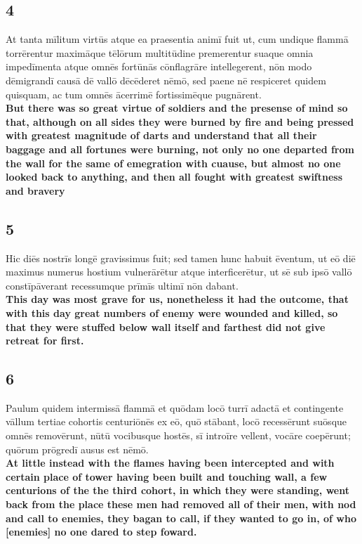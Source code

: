\documentclass{article}
\begin{document}
\subsection*{4}
At tanta mīlitum virtūs atque ea praesentia animī fuit ut, cum undique flammā torrērentur maximāque tēlōrum multitūdine premerentur suaque omnia impedīmenta atque omnēs fortūnās cōnflagrāre intellegerent, nōn modo dēmigrandī causā dē vallō dēcēderet nēmō, sed paene nē respiceret quidem quisquam, ac tum omnēs ācerrimē fortissimēque pugnārent. \\
\textbf{But there was so great virtue of soldiers and the presense of mind so that, although on all sides they were burned by fire and being pressed with greatest magnitude of darts and understand that all their baggage and all fortunes were burning, not only no one departed from the wall for the same of emegration with cuause, but almost no one looked back to anything, and then all fought with greatest swiftness and bravery}

\subsection*{5}
Hic diēs nostrīs longē gravissimus fuit; sed tamen hunc habuit ēventum, ut eō diē maximus numerus hostium vulnerārētur atque interficerētur, ut sē sub ipsō vallō constīpāverant recessumque prīmīs ultimī nōn dabant. \\
\textbf{This day was most grave for us, nonetheless it had the outcome, that with this day great numbers of enemy were wounded and killed, so that they were stuffed below wall itself and farthest did not give retreat for first.}

\subsection*{6}
Paulum quidem intermissā flammā et quōdam locō turrī adactā et contingente vāllum tertiae cohortis centuriōnēs ex eō, quō stābant, locō recessērunt suōsque omnēs removērunt, nūtū vocibusque hostēs, sī introīre vellent, vocāre coepērunt; quōrum prōgredī ausus est nēmō. \\
\textbf{At little instead with the flames having been intercepted and with certain place of tower having been built and touching wall, a few centurions of the the third cohort, in which they were standing, went back from the place these men had removed all of their men, with nod and call to enemies, they bagan to call, if they wanted to go in, of who [enemies] no one dared to step foward.}
\end{document}
